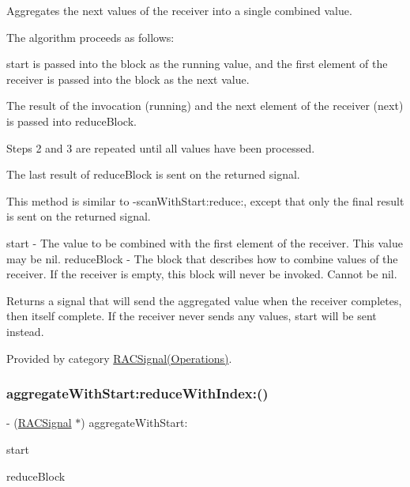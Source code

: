 Aggregates the {\ttfamily next} values of the receiver into a single combined value.

The algorithm proceeds as follows\+:


\begin{DoxyEnumerate}
\item {\ttfamily start} is passed into the block as the {\ttfamily running} value, and the first element of the receiver is passed into the block as the {\ttfamily next} value.
\item The result of the invocation ({\ttfamily running}) and the next element of the receiver ({\ttfamily next}) is passed into {\ttfamily reduce\+Block}.
\item Steps 2 and 3 are repeated until all values have been processed.
\item The last result of {\ttfamily reduce\+Block} is sent on the returned signal.
\end{DoxyEnumerate}

This method is similar to -\/scan\+With\+Start\+:reduce\+:, except that only the final result is sent on the returned signal.

start -\/ The value to be combined with the first element of the receiver. This value may be {\ttfamily nil}. reduce\+Block -\/ The block that describes how to combine values of the receiver. If the receiver is empty, this block will never be invoked. Cannot be nil.

Returns a signal that will send the aggregated value when the receiver completes, then itself complete. If the receiver never sends any values, {\ttfamily start} will be sent instead. 

Provided by category \mbox{\hyperlink{category_r_a_c_signal_07_operations_08_a4b872b6c2322aa37f98282043e768582}{R\+A\+C\+Signal(\+Operations)}}.

\mbox{\label{interface_r_a_c_signal_a83c6fc367091505aa6721f1c6a58d65d}} 
\subsubsection{\texorpdfstring{aggregate\+With\+Start\+:reduce\+With\+Index\+:()}{aggregateWithStart:reduceWithIndex:()}\hspace{0.1cm}{\footnotesize\ttfamily [1/3]}}
{\footnotesize\ttfamily -\/ (\mbox{\hyperlink{interface_r_a_c_signal}{R\+A\+C\+Signal}} $\ast$) aggregate\+With\+Start\+: \begin{DoxyParamCaption}\item[{(id)}]{start }\item[{reduceWithIndex:(id($^\wedge$)(id running, id next, N\+S\+U\+Integer index))}]{reduce\+Block }\end{DoxyParamCaption}}

